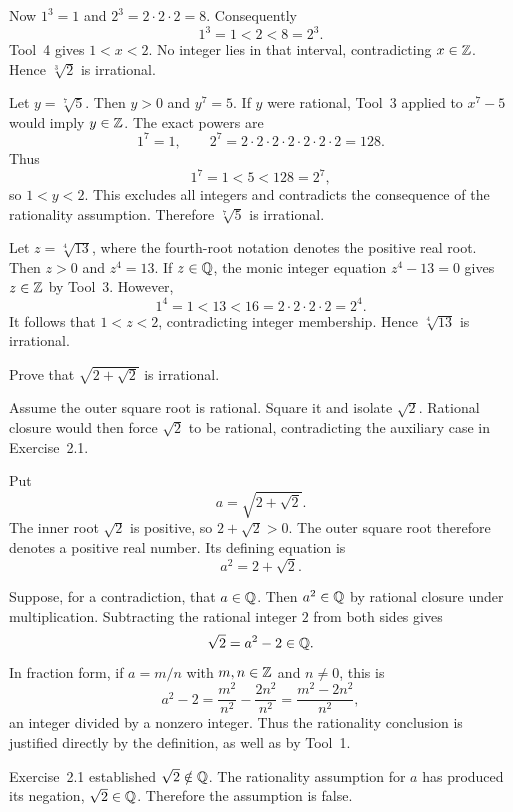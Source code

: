 Now $1^3=1$ and $2^3=2\cdot2\cdot2=8$. Consequently
\[
 1^3=1<2<8=2^3.
\]
Tool~4 gives $1<x<2$. No integer lies in that interval, contradicting
$x\in\mathbb{Z}$. Hence $\sqrt[3]{2}$ is irrational.

Let $y=\sqrt[7]{5}$. Then $y>0$ and $y^7=5$. If $y$ were rational,
Tool~3 applied to $x^7-5$ would imply $y\in\mathbb{Z}$. The exact powers are
\[
 1^7=1,\qquad
 2^7=2\cdot2\cdot2\cdot2\cdot2\cdot2\cdot2=128.
\]
Thus
\[
 1^7=1<5<128=2^7,
\]
so $1<y<2$. This excludes all integers and contradicts the consequence
of the rationality assumption. Therefore $\sqrt[7]{5}$ is irrational.

Let $z=\sqrt[4]{13}$, where the fourth-root notation denotes the
positive real root. Then $z>0$ and $z^4=13$. If $z\in\mathbb{Q}$, the monic
integer equation $z^4-13=0$ gives $z\in\mathbb{Z}$ by Tool~3. However,
\[
 1^4=1<13<16=2\cdot2\cdot2\cdot2=2^4.
\]
It follows that $1<z<2$, contradicting integer membership. Hence
$\sqrt[4]{13}$ is irrational.


\goal Prove that $\sqrt{2+\sqrt2}$ is irrational.

\idea Assume the outer square root is rational. Square it and isolate
$\sqrt2$. Rational closure would then force $\sqrt2$ to be rational,
contradicting the auxiliary case in Exercise~2.1.

Put
\[
 a=\sqrt{2+\sqrt2}.
\]
The inner root $\sqrt2$ is positive, so $2+\sqrt2>0$. The outer square
root therefore denotes a positive real number. Its defining equation is
\[
 a^2=2+\sqrt2.
\]

Suppose, for a contradiction, that $a\in\mathbb{Q}$. Then $a^2\in\mathbb{Q}$ by
rational closure under multiplication. Subtracting the rational integer
$2$ from both sides gives
\[
 \sqrt2=a^2-2\in\mathbb{Q}.
\]
In fraction form, if $a=m/n$ with $m,n\in\mathbb{Z}$ and $n\ne0$, this is
\[
 a^2-2=\frac{m^2}{n^2}-\frac{2n^2}{n^2}
       =\frac{m^2-2n^2}{n^2},
\]
an integer divided by a nonzero integer. Thus the rationality conclusion
is justified directly by the definition, as well as by Tool~1.

Exercise~2.1 established $\sqrt2\notin\mathbb{Q}$. The rationality assumption
for $a$ has produced its negation, $\sqrt2\in\mathbb{Q}$. Therefore the
assumption is false.

